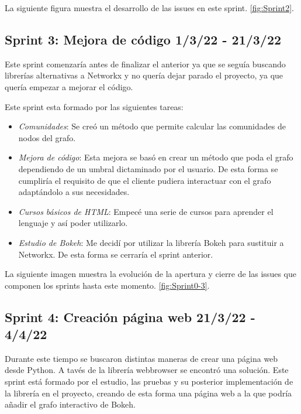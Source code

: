 La siguiente figura muestra el desarrollo de las issues en este sprint. \ref{fig:Sprint2}.


\subsection{Sprint 3: Mejora de código 1/3/22 - 21/3/22}
Este sprint comenzaría antes de finalizar el anterior ya que se seguía buscando librerías alternativas a Networkx y no quería dejar parado el proyecto, ya que quería empezar a mejorar el código.

Este sprint esta formado por las siguientes tareas:
\begin{itemize}
    \item \textit{Comunidades}: Se creó un método que permite calcular las comunidades de nodos del grafo.
    \item \textit{Mejora de código}: Esta mejora se basó en crear un método que poda el grafo dependiendo de un umbral dictaminado por el usuario. De esta forma se cumpliría el requisito de que el cliente pudiera interactuar con el grafo adaptándolo a sus necesidades.
    \item \textit{Cursos básicos de HTML}: Empecé una serie de cursos para aprender el lenguaje y así poder utilizarlo.
    \item \textit{Estudio de Bokeh}: Me decidí por utilizar la librería Bokeh para sustituir a Networkx. De esta forma se cerraría el sprint anterior.
\end{itemize}

La siguiente imagen muestra la evolución de la apertura y cierre de las issues que componen los sprints hasta este momento. \ref{fig:Sprint0-3}.




\subsection{Sprint 4: Creación página web 21/3/22 - 4/4/22}
Durante este tiempo se buscaron distintas maneras de crear una página web desde Python. A tavés de la librería webbrowser se encontró una solución. 
Este sprint está formado por el estudio, las pruebas y su posterior implementación de la librería en el proyecto, creando de esta forma una página web a la que podría añadir el grafo interactivo de Bokeh.

